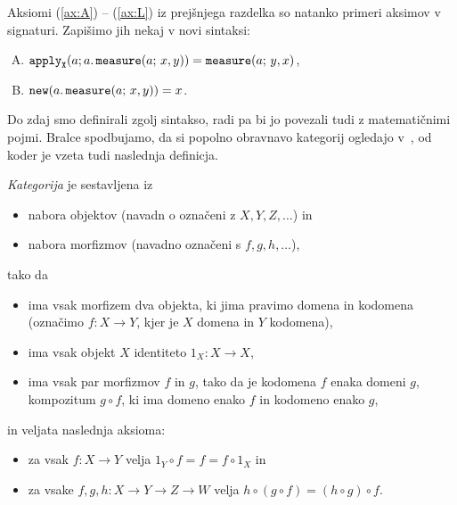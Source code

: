 \begin{example}
    Aksiomi (\ref{ax:A}) – (\ref{ax:L}) iz prejšnjega razdelka so natanko primeri aksimov v signaturi.
    Zapišimo jih nekaj v novi sintaksi:
    \begin{enumerate}[(A)]
        \item \( \textnormal{\ttfamily apply}_{\mathtt{X}}{\left( {a;a.\,\textnormal{\ttfamily measure}{\left( {a;\,x,y} \right)}} \right)} = \textnormal{\ttfamily measure}{\left( {a;\,y,x} \right)} \),
        \addtocounter{enumi}{2}
        \item \( \textnormal{\ttfamily new}{\left( {a.\,\textnormal{\ttfamily measure}{\left( {a;\,x,y} \right)}} \right)} = x \).\qedhere
    \end{enumerate}
\end{example}

Do zdaj smo definirali zgolj sintakso, radi pa bi jo povezali tudi z matematičnimi pojmi.
Bralce spodbujamo, da si popolno obravnavo kategorij ogledajo v~\cite{eriehl}, od koder je vzeta tudi naslednja definicja.

\begin{definition}
    \emph{Kategorija} je sestavljena iz
    \begin{itemize}
        \item nabora objektov (navadn o označeni z \(X,Y,Z,…\)) in
        \item nabora morfizmov (navadno označeni s \(f,g,h,…\)),
    \end{itemize}
    tako da
    \begin{itemize}
        \item ima vsak morfizem dva objekta, ki jima pravimo domena in kodomena (označimo \(f : X → Y\), kjer je \(X\) domena in \(Y\) kodomena),
        \item ima vsak objekt \(X\) identiteto \(1_X : X → X\),
        \item ima vsak par morfizmov \(f\) in \(g\), tako da je kodomena \(f\) enaka domeni \(g\), kompozitum \(g∘f\), ki ima domeno enako \(f\) in kodomeno enako \(g\),
    \end{itemize}
    in veljata naslednja aksioma:
    \begin{itemize}
        \item za vsak \(f : X → Y\) velja \(1_Y∘f = f = f∘1_X\) in
        \item za vsake \(f,g,h : X → Y → Z → W\) velja \(h∘(g∘f) = (h∘g)∘f\).
    \end{itemize}
\end{definition}

